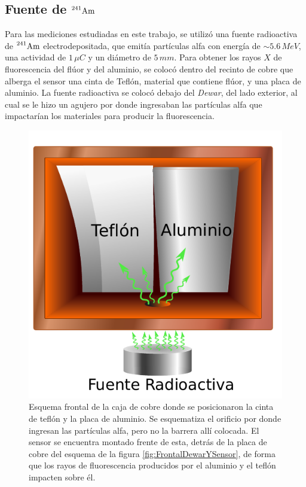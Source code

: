 \subsection{Fuente de 
\texorpdfstring{$\prescript{241}{}{\mbox{Am}}$}{Am241}
}
\noindent Para las mediciones estudiadas en este trabajo, se utilizó una fuente radioactiva de $\prescript{241}{}{\mbox{Am}}$ electrodepositada, que emitía partículas alfa con energía de $\sim 5.6\,\si{MeV}$, una actividad de $1\,\si{\mu C}$ y un diámetro de $5\,\si{mm}$. Para obtener los rayos $X$ de fluorescencia del flúor y del aluminio, se colocó dentro del recinto de cobre que alberga el sensor una cinta de Teflón, material que contiene flúor, y una placa de aluminio. La fuente radioactiva se colocó debajo del \textit{Dewar}, del lado exterior, al cual se le hizo un agujero por donde ingresaban las partículas alfa que impactarían los materiales para producir la fluorescencia.
\begin{figure}[h]
    \centering
    \includegraphics[scale=0.7]{Figs/CajaSensor.pdf}
    \caption{\footnotesize{Esquema frontal de la caja de cobre donde se posicionaron la cinta de teflón y la placa de aluminio. Se esquematiza el orificio por donde ingresan las partículas alfa, pero no la barrera allí colocada. El sensor se encuentra montado frente de esta, detrás de la placa de cobre del esquema de la figura \ref{fig:FrontalDewarYSensor}, de forma que los rayos de fluorescencia producidos por el aluminio y el teflón impacten sobre él.}}
    \label{fig:FrontalAlYF}
\end{figure}
